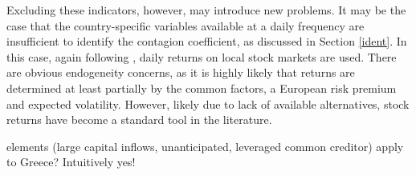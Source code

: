 \documentclass[/../base.tex]{subfiles}
\begin{document}
Excluding these indicators, however, may introduce new problems. It may be the case that the country-specific variables available at a daily frequency are insufficient to identify the contagion coefficient, as discussed in Section \ref{ident}. In this case, again following \cite{metiu2012sovereign}, daily returns on local stock markets are used. There are obvious endogeneity concerns, as it is highly likely that returns are determined at least partially by the common factors, a European risk premium and expected volatility. However, likely due to lack of available alternatives, stock returns have become a standard tool in the literature.


\cite{kaminsky2003unholy} elements (large capital inflows, unanticipated, leveraged common creditor) apply to Greece? Intuitively yes!
\end{document}
